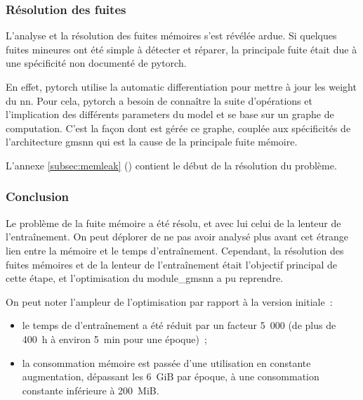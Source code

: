 \subsubsection{Résolution des fuites}
L'analyse et la résolution des fuites mémoires s'est révélée ardue. Si quelques fuites mineures ont été simple à détecter et réparer, la principale fuite était due à une spécificité non documenté de \gls{pytorch}.

En effet, \gls{pytorch} utilise la \gls{automatic differentiation} pour mettre à jour les \gls{weight} du \gls{nn}.
Pour cela, \gls{pytorch} a besoin de connaître la suite d'opérations et l'implication des différents \glspl{parameter} du \gls{model} et se base sur un \og graphe de computation\fg{}.
C'est la façon dont est gérée ce graphe, couplée aux spécificités de l'architecture \gls{gmsnn} qui est la cause de la principale fuite mémoire.

L'annexe \ref{subsec:memleak} () contient le début de la résolution du problème.

\subsubsection{Conclusion}
Le problème de la fuite mémoire a été résolu, et avec lui celui de la lenteur de l'entraînement.
On peut déplorer de ne pas avoir analysé plus avant cet étrange lien entre la mémoire et le temps d'entraînement.
Cependant, la résolution des fuites mémoires et de la lenteur de l'entraînement était l'objectif principal de cette étape, et l'optimisation du \gls{module_gmsnn} a pu reprendre.

On peut noter l'ampleur de l'optimisation par rapport à la version initiale~:
\begin{itemize}
	\item le temps de d'entraînement a été réduit par un facteur 5~000 (de plus de 400~h à environ 5~min pour une époque)~;
	\item la consommation mémoire est passée d'une utilisation en constante augmentation, dépassant les 6~GiB par époque, à une consommation constante inférieure à 200~MiB.
\end{itemize}